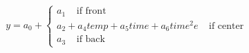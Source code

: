 

\[
y = a_0 + \left\{ \begin{array}{l} a_1 \;\;\;\; \mbox{if front} \\ a_2 + a_{4}temp + a_{5}time + a_{6}time^2 e \;\;\;\; \mbox{if center} \\ a_3 \;\;\;\; \mbox{if back} \end{array} \right.
\]



